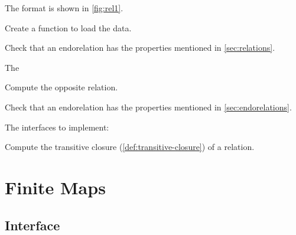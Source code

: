 The format is shown in \cref{fig:rel1}.


\begin{exercise}
  Create a function to load the data.


%

\end{exercise}


%  

\begin{exercise}

  Check that an endorelation has the properties mentioned in \cref{sec:relations}.

  The

\end{exercise}




\begin{exercise}[Opposite]
  Compute the opposite relation.


\end{exercise}

\begin{exercise}

  Check that an endorelation has the properties mentioned in \cref{sec:endorelations}.

  The interfaces to implement:

\end{exercise}

\begin{exercise}
  Compute the transitive closure (\cref{def:transitive-closure}) of a relation.


\end{exercise}


\section{Finite Maps}

\subsection*{Interface}

